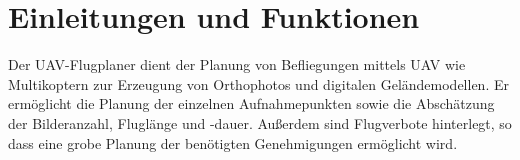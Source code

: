 \documentclass[a4paper,12pt,bibliography=totoc, listof=totoc,titlepage]{scrartcl}
\renewcommand{\arraystretch}{1.5}
\begin{document}


\providecommand{\citeTwo}[4]{\citep[{\citealp[#1]{#2};}][#3]{#4}} 
\providecommand{\citeThree}[6]{\citep[{\citealp[#1]{#2}; \citealp[#3]{#4};}][#5]{#6}} 
\providecommand{\citeFour}[8]{\citep[{\citealp[#1]{#2}; \citealp[#3]{#4}; \citealp[#5]{#6};}][#7]{#8}}

\newpage

\tableofcontents
\newpage

\setcounter{page}{1} 

\section{Einleitungen und Funktionen}
Der UAV-Flugplaner dient der Planung von Befliegungen mittels UAV wie Multikoptern zur Erzeugung von Orthophotos und digitalen Geländemodellen. Er ermöglicht die Planung der einzelnen Aufnahmepunkten sowie die Abschätzung der Bilderanzahl, Fluglänge und -dauer. Außerdem sind Flugverbote hinterlegt, so dass eine grobe Planung der benötigten Genehmigungen ermöglicht wird.
\end{document}

